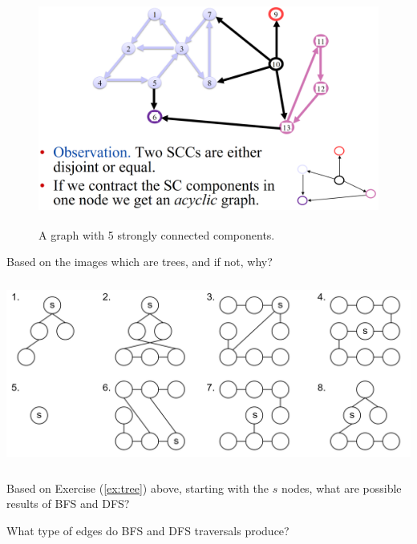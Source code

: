 \begin{figure}[h]
    \begin{center}
      \includegraphics[height=3in]{./Sections/graphs/dag/strong_conn.png}
    \end{center}
     \caption{A graph with 5 strongly connected components.}\label{fig:strong_conn}
\end{figure}

\newpage 

\begin{Exercise}Based on the images which are trees, and if not, why?

    \label{ex:tree}
    \vspace{1em}
    \hspace{-2em}
    \includegraphics[height=2.4in]{./Sections/graphs/dag/tree_example.png}

\end{Exercise}

\begin{Exercise} Based on Exercise (\ref{ex:tree}) above, starting with the $s$ nodes,
    what are possible results of BFS and DFS?
\end{Exercise}

\vspace{.5em}
\begin{Exercise} What type of edges do BFS and DFS traversals produce?
\end{Exercise}

